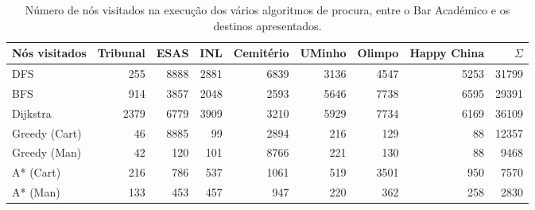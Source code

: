 \documentclass[12pt, a4paper]{article}
\begin{document}
\begin{table}[H]
    \small

    \begin{adjustwidth}{-1.5cm}{-1.5cm}
        \begin{center}
            \begin{tabular}{|l|r|r|r|r|r|r|r|r|}
                \hline
                    Nós visitados &
                    Tribunal      &
                    ESAS          &
                    INL           &
                    Cemitério     &
                    UMinho        &
                    Olimpo        &
                    Happy China   &
                    $\Sigma$      \\

                \hline
                DFS & 255 & 8888 & 2881 & 6839 & 3136 & 4547 & 5253 & 31799 \\
                \hline
                BFS & 914 & 3857 & 2048 & 2593 & 5646 & 7738 & 6595 & 29391 \\
                \hline
                Dijkstra & 2379 & 6779 & 3909 & 3210 & 5929 & 7734 & 6169 & 36109 \\
                \hline
                Greedy (Cart) & 46 & 8885 & 99 & 2894 & 216 & 129 & 88 & 12357 \\
                \hline
                Greedy (Man) & 42 & 120 & 101 & 8766 & 221 & 130 & 88 & 9468 \\
                \hline
                A* (Cart) & 216 & 786 & 537 & 1061 & 519 & 3501 & 950 & 7570 \\
                \hline
                A* (Man) & 133 & 453 & 457 & 947 & 220 & 362 & 258 & 2830 \\
                \hline
            \end{tabular}
        \end{center}
    \end{adjustwidth}

    \caption{
        Número de nós visitados na execução dos vários algoritmos de procura, entre o Bar Académico
        e os destinos apresentados.
    }
\end{table}
\end{document}
